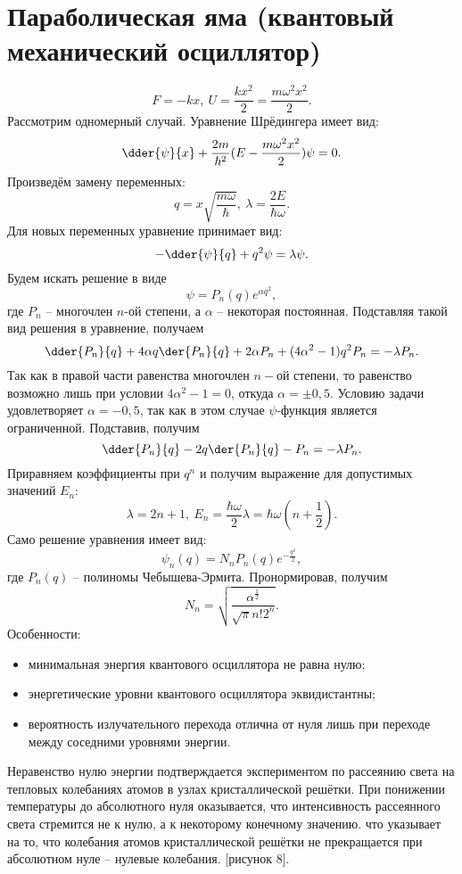 \section{Параболическая яма (квантовый механический осциллятор)}
\[
    F = -kx,\ U = \frac{kx^2}{2} = \frac{m\omega^2x^2}{2}.
\]
Рассмотрим одномерный случай. Уравнение Шрёдингера имеет вид:
\[
    \dder{\psi}{x} + \frac{2m}{\hbar^2}(E - \frac{m\omega^2x^2}{2})\psi = 0.
\]
Произведём замену переменных:
\[
    q = x\sqrt{\frac{m\omega}{\hbar}},\ \lambda = \frac{2E}{\hbar\omega}.
\]
Для новых переменных уравнение принимает вид:
\[
    -\dder{\psi}{q} + q^2\psi = \lambda\psi.
\]
Будем искать решение в виде
\[
    \psi = P_n(q)e^{\alpha q^2},
\]
где \( P_n \) -- многочлен \( n \)-ой степени, а \( \alpha \) -- некоторая
постоянная. Подставляя такой вид решения в уравнение, получаем
\[
    \dder{P_n}{q} + 4\alpha q\der{P_n}{q} + 2\alpha P_n + (4\alpha^2 -1)q^2P_n =
    -\lambda P_n.
\]
Так как в правой части равенства многочлен \( n-\text{ой} \) степени, то
равенство возможно лишь при условии \( 4\alpha^2 - 1 = 0 \), откуда
\( \alpha = \pm0,5 \). Условию задачи удовлетворяет \( \alpha = -0,5 \), так как
в этом случае \( \psi \)-функция является ограниченной. Подставив, получим
\[
    \dder{P_n}{q} - 2q\der{P_n}{q} - P_n = -\lambda P_n.
\]
Приравняем коэффициенты при \( q^n \) и получим выражение для допустимых
значений \( E_n \):
\[
    \lambda = 2n+1,\ E_n = \frac{\hbar\omega}{2}\lambda =
    \hbar\omega\left(n+\frac{1}{2}\right).
\]
Само решение уравнения имеет вид:
\[
    \psi_n(q) = N_nP_n(q)e^{-\frac{q^2}{2}},
\]
где \( P_n(q) \) -- полиномы Чебышева-Эрмита. Пронормировав, получим
\[
    N_n = \sqrt{\frac{\alpha^\frac{1}{2}}{\sqrt{\pi}n!2^n}}.
\]
Особенности:
\begin{itemize}
    \item минимальная энергия квантового осциллятора не равна нулю;
    \item энергетические уровни квантового осциллятора эквидистантны;
    \item вероятность излучательного перехода отлична от нуля лишь при переходе
    между соседними уровнями энергии.
\end{itemize}

Неравенство нулю энергии подтверждается экспериментом по рассеянию света на
тепловых колебаниях атомов в узлах кристаллической решётки. При понижении
температуры до абсолютного нуля оказывается, что интенсивность рассеянного света
стремится не к нулю, а к некоторому конечному значению. что указывает на то, что
колебания атомов кристаллической решётки не прекращается при абсолютном нуле -- 
нулевые колебания.
[рисунок 8].

\newpage
